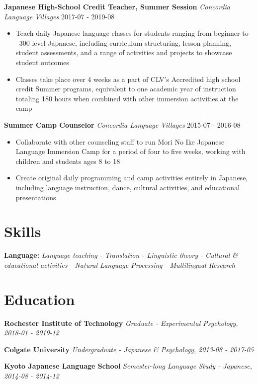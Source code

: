 \documentclass[a4paper,9pt]{extarticle}
\begin{document}
\noindent
\textbf{Japanese High-School Credit Teacher, Summer Session}
\noindent
\textit{Concordia Language Villages} \hfill 2017-07 - 2019-08
\begin{itemize}
\item Teach daily Japanese language classes for students ranging from beginner to ~300 level Japanese, including curriculum structuring, lesson planning, student assessments, and a range of activities and projects to showcase student outcomes
\item Classes take place over 4 weeks as a part of CLV's Accredited high school credit Summer programs, equivalent to one academic year of instruction totaling 180 hours when combined with other immersion activities at the camp
\end{itemize}

\noindent
\textbf{Summer Camp Counselor}
\noindent
\textit{Concordia Language Villages} \hfill 2015-07 - 2016-08
\begin{itemize}
\item Collaborate with other counseling staff to run Mori No Ike Japanese Language Immersion Camp for a period of four to five weeks, working with children and students ages 8 to 18
\item Create original daily programming and camp activities entirely in Japanese, including language instruction, dance, cultural activities, and educational presentations
\end{itemize}

\section*{Skills}

\noindent
\textbf{Language:}
\textit{Language teaching - Translation - Linguistic theory - Cultural \& educational activities - Natural Language Processing - Multilingual Research}

\section*{Education}

\noindent
\textbf{Rochester Institute of Technology}
\textit{Graduate - Experimental Psychology, 2018-01 - 2019-12}

\noindent
\textbf{Colgate University}
\textit{Undergraduate - Japanese \& Psychology, 2013-08 - 2017-05}

\noindent
\textbf{Kyoto Japanese Language School}
\textit{Semester-long Language Study - Japanese, 2014-08 - 2014-12}
\end{document}
